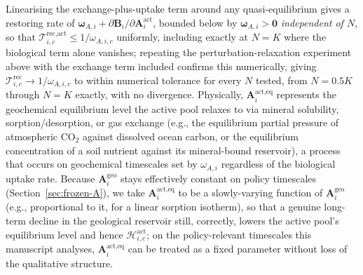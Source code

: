 \documentclass[twocolumn,10pt]{article}
\begin{document}
Linearising the exchange-plus-uptake term around any quasi-equilibrium gives a restoring rate of $\boldsymbol\omega_{A,i}+\partial\mathbf B_i/\partial\mathbf A^{\text{act}}_i$, bounded below by $\boldsymbol\omega_{A,i}>\mathbf 0$ \emph{independent of $N$}, so that $\mathcal T^{\text{rec},\text{act}}_{i,c}\le 1/\omega_{A,i,c}$ uniformly, including exactly at $N=K$ where the biological term alone vanishes; repeating the perturbation-relaxation experiment above with the exchange term included confirms this numerically, giving $\mathcal T^{\text{rec}}_{i,c}\to1/\omega_{A,i,c}$ to within numerical tolerance for every $N$ tested, from $N=0.5K$ through $N=K$ exactly, with no divergence. Physically, $\mathbf A^{\text{act},\text{eq}}_i$ represents the geochemical equilibrium level the active pool relaxes to via mineral solubility, sorption/desorption, or gas exchange (e.g., the equilibrium partial pressure of atmospheric $\text{CO}_2$ against dissolved ocean carbon, or the equilibrium concentration of a soil nutrient against its mineral-bound reservoir), a process that occurs on geochemical timescales set by $\omega_{A,i}$ regardless of the biological uptake rate. Because $\mathbf A^{\text{geo}}_i$ stays effectively constant on policy timescales (Section~\ref{sec:frozen-A}), we take $\mathbf A^{\text{act},\text{eq}}_i$ to be a slowly-varying function of $\mathbf A^{\text{geo}}_i$ (e.g., proportional to it, for a linear sorption isotherm), so that a genuine long-term decline in the geological reservoir still, correctly, lowers the active pool's equilibrium level and hence $\mathcal H^{\text{act}}_{i,c}$; on the policy-relevant timescales this manuscript analyses, $\mathbf A^{\text{act},\text{eq}}_i$ can be treated as a fixed parameter without loss of the qualitative structure.
\end{document}

